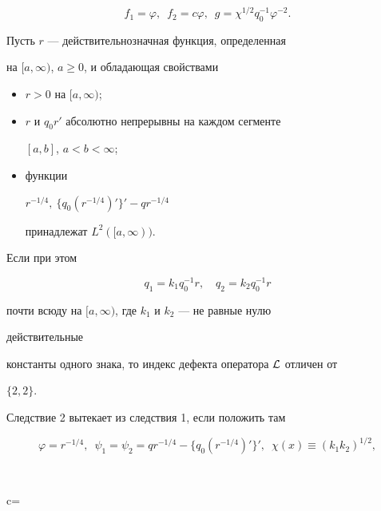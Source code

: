$$ 


f_1=\varphi,\ \; f_2=c\varphi, 


\ \; g=\chi^{1/2}q^{-1}_0\varphi^{-2}. 


$$ 


 


\begin{cor} 


Пусть $r$ --- действительнозначная функция, определенная 


на $[a,\infty)$, $a\ge0$, и обладающая свойствами 


\begin{itemize} 


\item[1)] $r>0$ на $[a,\infty)$; 


\item[2)] $r$ и $q_0r'$ абсолютно непрерывны на каждом сегменте 


$[a,b]$, $a<b<\infty$; 


\item[3)] функции 


$r^{-1/4},\ \{q_0(r^{-1/4})'\}'-q r^{-1/4}$ 


принадлежат $L^2([a,\infty))$. 


\end{itemize} 


Если при этом 


$$ 


q_1=k_1q^{-1}_0r,\quad q_2=k_2q^{-1}_0r 


$$ 


почти всюду на $[a,\infty)$, где $k_1$ и $k_2$ --- не равные нулю 


действительные 


константы одного знака, то индекс дефекта оператора $\cal L$ отличен от 


$\{2,2\}$. 


\end{cor} 


 


Следствие 2 вытекает из следствия 1, если положить там 


$$ 


\varphi=r^{-1/4},\ \; \psi_1=\psi_2=q r^{-1/4}- 


\{q_0(r^{-1/4})'\}',\ \; \chi(x)\equiv(k_1k_2)^{1/2}, 


$$ 


$$ 


c= 


